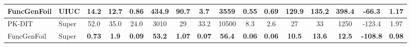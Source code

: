 \begin{table*}[ht]
{\begin{tabular}{llcccccccccccccc}
        \rowcolor{gray!20} FuncGenFoil & UIUC & \textbf{14.2} & \textbf{12.7} & \textbf{0.86} & \textbf{434.9} & 90.7 & \textbf{3.7} & \textbf{3559} & \textbf{0.55} & \textbf{0.69} & 129.9 & 135.2 & \textbf{398.4} & \textbf{-66.3} & \textbf{1.17} \\
        \midrule
        PK-DIT & Super & 52.0 & 35.0 & 24.0 & 3010 & 29 & 33.2 & 10500 & 8.3 & 2.6 & 27 & 33 & 1250 & -123.4 & 1.97 \\
        \rowcolor{gray!20} FuncGenFoil & Super & \textbf{0.73} & \textbf{1.9} & \textbf{0.09} & \textbf{53.2} & \textbf{1.07} & \textbf{0.07} & \textbf{56.4} & \textbf{0.06} & \textbf{0.06} & \textbf{10.5} & \textbf{13.6} & \textbf{12.5} & \textbf{-108.8} & \textbf{0.98} \\
        
        \bottomrule
    \end{tabular}
    }
    \label{tab:cond_gen}
\end{table*}